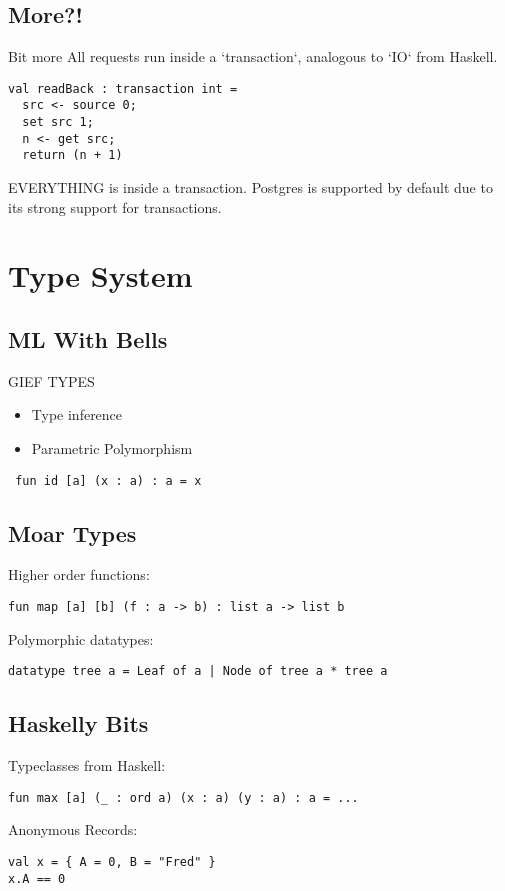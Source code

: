 \documentclass{beamer}
\begin{document}
\subsection{More?!}
\begin{frame}[fragile]{Bit more}
All requests run inside a `transaction`, analogous to `IO` from Haskell.
\begin{verbatim}
val readBack : transaction int =
  src <- source 0;
  set src 1;
  n <- get src;
  return (n + 1)
\end{verbatim}
EVERYTHING is inside a transaction. Postgres is supported by default due to its strong support for transactions.
\end{frame}

\section{Type System}
\subsection{ML With Bells}
\begin{frame}[fragile]{GIEF TYPES}
\begin{itemize}
\item Type inference
\item Parametric Polymorphism
\end{itemize}
\begin{verbatim} fun id [a] (x : a) : a = x \end{verbatim}
\end{frame}

\subsection{Moar Types}
\begin{frame}[fragile]
Higher order functions:
\begin{verbatim}
fun map [a] [b] (f : a -> b) : list a -> list b
\end{verbatim}
Polymorphic datatypes:
\begin{verbatim}
datatype tree a = Leaf of a | Node of tree a * tree a
\end{verbatim}
\end{frame}

\subsection{Haskelly Bits}
\begin{frame}[fragile]
Typeclasses from Haskell:
\begin{verbatim}
fun max [a] (_ : ord a) (x : a) (y : a) : a = ...
\end{verbatim}
Anonymous Records:
\begin{verbatim}
val x = { A = 0, B = "Fred" }
x.A == 0
\end{verbatim}
\end{frame}
\end{document}
